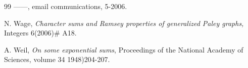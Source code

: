 \documentclass[submission%
]{dmtcs}
\begin{document}
\begin{thebibliography}{99}
 ------, email communications, 5-2006.



 N. Wage, {\it Character sums and Ramsey properties of 
generalized Paley graphs,} Integers 6(2006)\# A18.

  A. Weil, {\it On some exponential sums},
Proceedings of the National Academy of Sciences, volume 34 1948)204-207.


\end{thebibliography}
\end{document}
